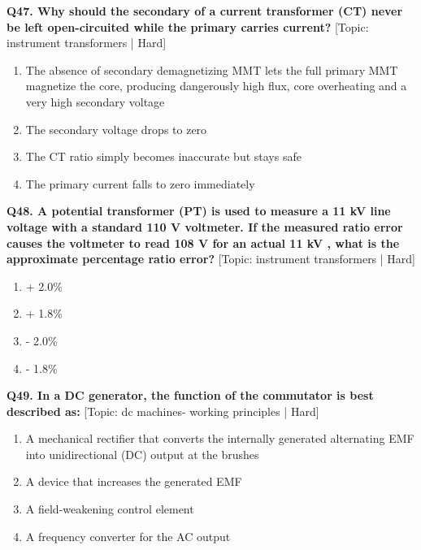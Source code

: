 \noindent\textbf{Q47. Why should the secondary of a current transformer (CT) never be left open-circuited while the primary carries current?} \hfill [Topic: instrument transformers | Hard]
\begin{enumerate}[label=(\alph*),topsep=2pt,itemsep=1pt,partopsep=0pt,parsep=0pt]
    \item {The absence of secondary demagnetizing MMT lets the full primary MMT magnetize the core, producing dangerously high flux, core overheating and a very high secondary voltage}
    \item {The secondary voltage drops to zero}
    \item {The CT ratio simply becomes inaccurate but stays safe}
    \item {The primary current falls to zero immediately}
\end{enumerate}
\vspace{2mm}

\noindent\textbf{Q48. A potential transformer (PT) is used to measure a 11 kV line voltage with a standard 110 V voltmeter. If the measured ratio error causes the voltmeter to read 108 V for an actual 11 kV , what is the approximate percentage ratio error?} \hfill [Topic: instrument transformers | Hard]
\begin{enumerate}[label=(\alph*),topsep=2pt,itemsep=1pt,partopsep=0pt,parsep=0pt]
    \item {+ 2.0\%}
    \item {+ 1.8\%}
    \item {- 2.0\%}
    \item {- 1.8\%}
\end{enumerate}
\vspace{2mm}

\noindent\textbf{Q49. In a DC generator, the function of the commutator is best described as:} \hfill [Topic: dc machines- working principles | Hard]
\begin{enumerate}[label=(\alph*),topsep=2pt,itemsep=1pt,partopsep=0pt,parsep=0pt]
    \item {A mechanical rectifier that converts the internally generated alternating EMF into unidirectional (DC) output at the brushes}
    \item {A device that increases the generated EMF}
    \item {A field-weakening control element}
    \item {A frequency converter for the AC output}
\end{enumerate}
\vspace{2mm}

